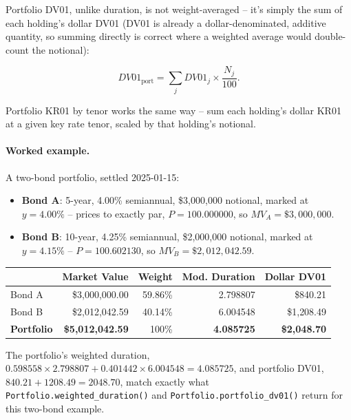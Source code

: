 \documentclass[11pt]{article}
\begin{document}
Portfolio DV01, unlike duration, is not weight-averaged -- it's simply the sum of each
holding's dollar DV01 (DV01 is already a dollar-denominated, additive quantity, so summing
directly is correct where a weighted average would double-count the notional):

\begin{equation}
  DV01_{\text{port}} = \sum_j DV01_j \times \frac{N_j}{100}.
  \label{eq:portfolio-dv01}
\end{equation}

Portfolio KR01 by tenor works the same way -- sum each holding's dollar KR01 at a given key
rate tenor, scaled by that holding's notional.

\paragraph{Worked example.} A two-bond portfolio, settled 2025-01-15:

\begin{itemize}[nosep]
  \item \textbf{Bond A}: 5-year, 4.00\% semiannual, \$3{,}000{,}000 notional, marked at
        $y=4.00\%$ -- prices to exactly par, $P = 100.000000$, so $MV_A = \$3{,}000{,}000$.
  \item \textbf{Bond B}: 10-year, 4.25\% semiannual, \$2{,}000{,}000 notional, marked at
        $y=4.15\%$ -- $P = 100.602130$, so $MV_B = \$2{,}012{,}042.59$.
\end{itemize}

\begin{center}
\begin{tabular}{@{}lrrrr@{}}
\toprule
 & Market Value & Weight & Mod. Duration & Dollar DV01 \\
\midrule
Bond A & \$3,000,000.00 & 59.86\% & 2.798807 & \$840.21 \\
Bond B & \$2,012,042.59 & 40.14\% & 6.004548 & \$1{,}208.49 \\
\midrule
\textbf{Portfolio} & \textbf{\$5{,}012{,}042.59} & 100\% & \textbf{4.085725} & \textbf{\$2{,}048.70} \\
\bottomrule
\end{tabular}
\end{center}

The portfolio's weighted duration, $0.598558 \times 2.798807 + 0.401442 \times 6.004548 =
4.085725$, and portfolio DV01, $840.21 + 1208.49 = 2048.70$, match exactly what
\texttt{Portfolio.weighted\_duration()} and \texttt{Portfolio.portfolio\_dv01()} return for
this two-bond example.
\end{document}
